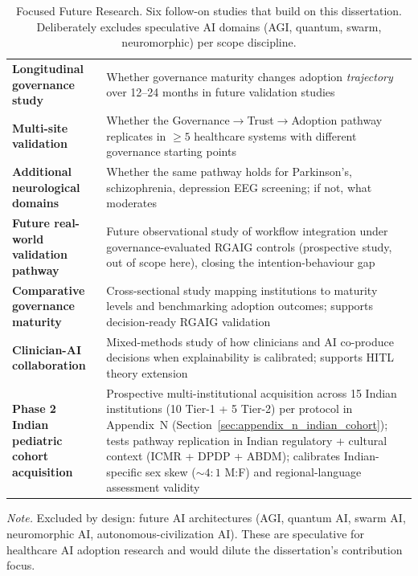 {\tablestripes\tablefontsize
{}
\begin{xltabular}{\textwidth}{@{} >{\raggedright\arraybackslash}p{3.0cm} L @{}}
\caption[Focused Future Research]{Focused Future Research. Six follow-on studies that build on this dissertation. Deliberately excludes speculative AI domains (AGI, quantum, swarm, neuromorphic) per scope discipline.}\label{tab:ch5_future_work} \\
\toprule
{} &  \\
\midrule
\endfirsthead
\endhead
\bottomrule
\endlastfoot
\textbf{Longitudinal governance study}      & Whether governance maturity changes adoption \emph{trajectory} over 12--24 months in future validation studies \\
\textbf{Multi-site validation}              & Whether the Governance$\to$Trust$\to$Adoption pathway replicates in $\geq 5$ healthcare systems with different governance starting points \\
\textbf{Additional neurological domains}    & Whether the same pathway holds for Parkinson's, schizophrenia, depression EEG screening; if not, what moderates \\
\textbf{Future real-world validation pathway}   & Future observational study of workflow integration under governance-evaluated RGAIG controls (prospective study, out of scope here), closing the intention-behaviour gap \\
\textbf{Comparative governance maturity}    & Cross-sectional study mapping institutions to maturity levels and benchmarking adoption outcomes; supports decision-ready RGAIG validation \\
\textbf{Clinician-AI collaboration}         & Mixed-methods study of how clinicians and AI co-produce decisions when explainability is calibrated; supports HITL theory extension \\
\textbf{Phase 2 Indian pediatric cohort acquisition} & Prospective multi-institutional acquisition across 15 Indian institutions (10 Tier-1 + 5 Tier-2) per protocol in Appendix~N (Section~\ref{sec:appendix_n_indian_cohort}); tests pathway replication in Indian regulatory + cultural context (ICMR + DPDP + ABDM); calibrates Indian-specific sex skew ($\sim 4:1$ M:F) and regional-language assessment validity \\
\end{xltabular}}
\vspace{0.4em}
\noindent\textit{Note.} Excluded by design: future AI architectures (AGI, quantum AI, swarm AI, neuromorphic AI, autonomous-civilization AI). These are speculative for healthcare AI adoption research and would dilute the dissertation's contribution focus.

